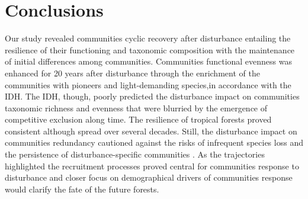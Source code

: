 \documentclass[fleqn,10pt]{ArtEcoFoG} %
\theoremstyle{definition}
\theoremstyle{definition}
\theoremstyle{definition}
\theoremstyle{remark}
\begin{document}
\section{Conclusions}\label{conclusions}

Our study revealed communities cyclic recovery after disturbance
entailing the resilience of their functioning and taxonomic composition
with the maintenance of initial differences among communities.
Communities functional evenness was enhanced for 20 years after
disturbance through the enrichment of the communities with pioneers and
light-demanding species,in accordance with the IDH. The IDH, though,
poorly predicted the disturbance impact on communities taxonomic
richness and evenness that were blurried by the emergence of competitive
exclusion along time. The resilience of tropical forests proved
consistent although spread over several decades. Still, the disturbance
impact on communities redundancy cautioned against the risks of
infrequent species loss and the persistence of disturbance-specific
communities \citep{Gourlet-Fleury2005}. As the trajectories highlighted
the recruitment processes proved central for communities response to
disturbance and closer focus on demographical drivers of communities
response would clarify the fate of the future forests.



\makeatletter

\makeatother


\end{document}
